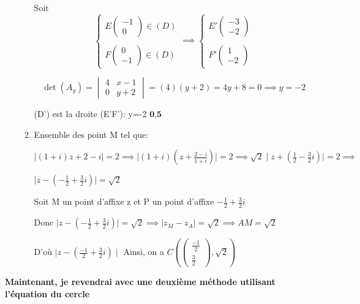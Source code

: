 \documentclass[12pt]{article}
\begin{document}
\begin{enumerate}
\begin{enumerate}
Soit  
\[
\begin{cases}
E\begin{pmatrix} -1 \\ 
0\end{pmatrix}\in (D)\\ \\
F\begin{pmatrix} 0 \\ -1\end{pmatrix}\in (D)
\end{cases} \implies 
\begin{cases}
E'\begin{pmatrix} -3 \\ -2\end{pmatrix}\\ \\
F'\begin{pmatrix} 1 \\ -2\end{pmatrix}
\end{cases}
\]

\[
\det(A_y) = \begin{vmatrix}
4 & x-1 \\
0 & y+2
\end{vmatrix} = (4)(y+2) = 4y+8=0\implies y=-2
\]

(D') est la droite (E'F'): y=-2 $\textbf{0,5}$


\item Ensemble des point M tel que:

$\mid (1+i)z+2-i\mid=2 \implies \mid (1+i)\left( z+\frac{2-i}{1+i}\right) \mid=2 \implies \sqrt{2}\mid z+\left( \frac{1}{2}-\frac{3}{2}i\right) \mid=2 \implies $

$\mid z-\left( -\frac{1}{2}+\frac{3}{2}i\right) \mid=\sqrt{2}$

Soit M un point d'affixe z et P un point d'affixe $-\frac{1}{2}+\frac{3}{2}i$

Donc $ \mid z-\left( -\frac{1}{2}+\frac{3}{2}i\right) \mid=\sqrt{2} \implies \mid z_{M}- z_{A} \mid=\sqrt{2} \implies AM=\sqrt{2}$


D'où $\mid z-(\frac{-1}{2}+\frac{3}{2}i)\mid$ Ainsi, on a $ C\left( \begin{pmatrix} \frac{-1}{2} \\ \frac{3}{2}\end{pmatrix}, \sqrt{2}\right) $
\end{enumerate}
\end{enumerate}

\textbf{Maintenant, je revendrai avec une deuxième méthode utilisant l'équation du cercle}
\end{document}
